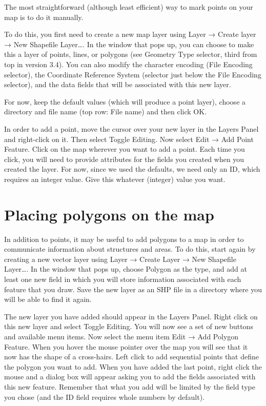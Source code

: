 \documentclass[]{book}
\begin{document}
The most straightforward (although least efficient) way to mark points on your map is to do it manually.

To do this, you first need to create a new map layer using Layer → Create layer → New Shapefile Layer\ldots{}. In the window that pops up, you can choose to make this a layer of points, lines, or polygons (see Geometry Type selector, third from top in version 3.4). You can also modify the character encoding (File Encoding selector), the Coordinate Reference System (selector just below the File Encoding selector), and the data fields that will be associated with this new layer.

For now, keep the default values (which will produce a point layer), choose a directory and file name (top row: File name) and then click OK.

In order to add a point, move the cursor over your new layer in the Layers Panel and right-click on it. Then select Toggle Editing. Now select Edit → Add Point Feature. Click on the map wherever you want to add a point. Each time you click, you will need to provide attributes for the fields you created when you created the layer. For now, since we used the defaults, we need only an ID, which requires an integer value. Give this whatever (integer) value you want.

\hypertarget{placing-polygons-on-the-map}{%
\section{Placing polygons on the map}\label{placing-polygons-on-the-map}}

In addition to points, it may be useful to add polygons to a map in order to communicate information about structures and areas. To do this, start again by creating a new vector layer using Layer → Create Layer → New Shapefile Layer\ldots{}. In the window that pops up, choose Polygon as the type, and add at least one new field in which you will store information associated with each feature that you draw. Save the new layer as an SHP file in a directory where you will be able to find it again.

The new layer you have added should appear in the Layers Panel. Right click on this new layer and select Toggle Editing. You will now see a set of new buttons and available menu items. Now select the menu item Edit → Add Polygon Feature. When you hover the mouse pointer over the map you will see that it now has the shape of a cross-hairs. Left click to add sequential points that define the polygon you want to add. When you have added the last point, right click the mouse and a dialog box will appear asking you to add the fields associated with this new feature. Remember that what you add will be limited by the field type you chose (and the ID field requires whole numbers by default).


\end{document}
